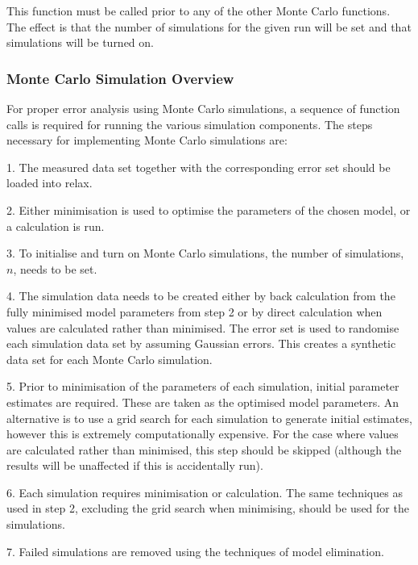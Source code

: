 This function must be called prior to any of the other Monte Carlo functions.  The effect is that the number of simulations for the given run will be set and that simulations will be turned on.



\subsubsection{Monte Carlo Simulation Overview}

For proper error analysis using Monte Carlo simulations, a sequence of function calls is required for running the various simulation components.  The steps necessary for implementing Monte Carlo simulations are:


1.  The measured data set together with the corresponding error set should be loaded into relax.


2.  Either minimisation is used to optimise the parameters of the chosen model, or a calculation is run.


3.  To initialise and turn on Monte Carlo simulations, the number of simulations, $n$, needs to be set.


4.  The simulation data needs to be created either by back calculation from the fully minimised model parameters from step 2 or by direct calculation when values are calculated rather than minimised.  The error set is used to randomise each simulation data set by assuming Gaussian errors.  This creates a synthetic data set for each Monte Carlo simulation.


5.  Prior to minimisation of the parameters of each simulation, initial parameter estimates are required.  These are taken as the optimised model parameters.  An alternative is to use a grid search for each simulation to generate initial estimates, however this is extremely computationally expensive.  For the case where values are calculated rather than minimised, this step should be skipped (although the results will be unaffected if this is accidentally run).


6.  Each simulation requires minimisation or calculation.  The same techniques as used in step 2, excluding the grid search when minimising, should be used for the simulations.


7.  Failed simulations are removed using the techniques of model elimination.


